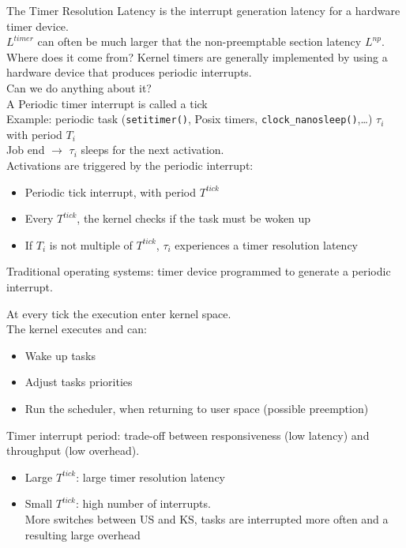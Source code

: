 The Timer Resolution Latency is the interrupt generation latency for a hardware timer device.\\
$L^{timer}$ can often be much larger that the non-preemptable section latency $L^{np}$.\\
Where does it come from? Kernel timers are generally implemented by using a hardware device that produces periodic interrupts.\\
Can we do anything about it?\\
A Periodic timer interrupt is called a tick\\
Example: periodic task (\texttt{setitimer()}, Posix timers, \texttt{clock\_nanosleep()},\dots) $\tau_i$ with period $T_i$\\
Job end $\rightarrow$ $\tau_i$ sleeps for the next activation.\\
Activations are triggered by the periodic interrupt:
\begin{itemize}
    \item Periodic tick interrupt, with period $T^{tick}$
    \item Every $T^{tick}$, the kernel checks if the task must be woken up
    \item If $T_i$ is not multiple of $T^{tick}$, $\tau_i$ experiences a timer resolution latency
\end{itemize}

Traditional operating systems: timer device programmed to generate a periodic interrupt.

At every tick the execution enter kernel space.\\
The kernel executes and can:
\begin{itemize}
    \item Wake up tasks
    \item Adjust tasks priorities
    \item Run the scheduler, when returning to user space (possible preemption)
\end{itemize}

Timer interrupt period: trade-off between responsiveness (low latency) and throughput (low overhead).
\begin{itemize}
    \item Large $T^{tick}$: large timer resolution latency
    \item Small $T^{tick}$: high number of interrupts.\\
More switches between US and KS, tasks are interrupted more often and a resulting large overhead
\end{itemize}

